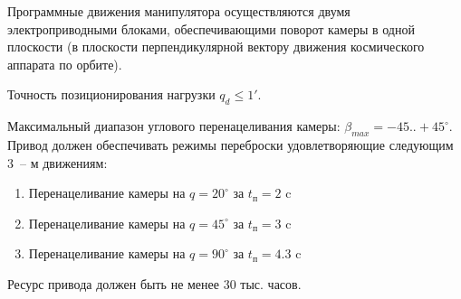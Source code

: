 Программные движения манипулятора осуществляются двумя электроприводными блоками,
обеспечивающими поворот камеры в одной плоскости (в плоскости перпендикулярной
вектору движения космического аппарата по орбите).

Точность позиционирования нагрузки $q_d \leq 1'$.

Максимальный диапазон углового перенацеливания камеры: $\beta_{max} = -45..+45^\circ$.
Привод должен обеспечивать режимы переброски удовлетворяющие следующим 3~-- м движениям:

\begin{enumerate}
    \item Перенацеливание камеры на $q = 20^\circ$ за $t_\textit{п} = 2  $ c
    \item Перенацеливание камеры на $q = 45^\circ$ за $t_\textit{п} = 3  $ c
    \item Перенацеливание камеры на $q = 90^\circ$ за $t_\textit{п} = 4.3$ c
\end{enumerate}

Ресурс привода должен быть не менее 30 тыс. часов.
